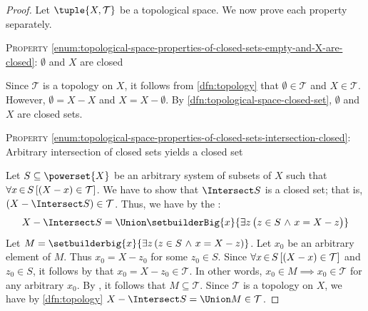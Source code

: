 \begin{proof}
    Let \( \tuple{X, \mathcal{T}} \) be a topological space. We now prove each property separately.
    
    \vspace{0.3cm}
    \noindent
    {\scshape Property} \ref{enum:topological-space-properties-of-closed-sets-empty-and-X-are-closed}: \( \emptyset \) and \( X \) are closed

    \vspace{0.1cm}
    \noindent
    Since \( \mathcal{T} \) is a topology on \( X \), it follows from \cref{dfn:topology} that \( \emptyset \in \mathcal{T} \) and \( X \in \mathcal{T} \).
    However, \( \emptyset = X - X \) and \( X = X - \emptyset \). By \cref{dfn:topological-space-closed-set}, \( \emptyset \) and \( X \) are closed sets.

    \vspace{0.3cm}
    \noindent
    {\scshape Property} \ref{enum:topological-space-properties-of-closed-sets-intersection-closed}: Arbitrary intersection of closed sets yields a closed set

    \vspace{0.1cm}
    \noindent
    Let \( S \subseteq \powerset{X} \) be an arbitrary system of subsets of \( X \) such that \( \forall x\,{\in}\,S \, \mleft[ (X - x) \in \mathcal{T} \mright] \).
    We have to show that \( \Intersect S \) is a closed set; that is, \( \mleft( X - \Intersect S \mright) \in \mathcal{T} \).
    Thus, we have by the :
    \begin{equation*}
        X - \Intersect S = \Union \setbuilderBig{x}{\exists z \, \big( z \in S \,\,{\land}\,\, x = X - z \big)}
    \end{equation*}
    Let \( M = \setbuilderbig{x}{\exists z \, \mleft( z \in S \,\,{\land}\,\, x = X - z \mright)} \). Let \( x_{0} \) be an arbitrary element of \( M \).
    Thus \(x_{0} = X - z_{0}\) for some \( z_{0} \in S \). Since \( \forall x\,{\in}\,S \, \mleft[ \mleft( X - x \mright) \in \mathcal{T} \mright] \) and
    \( z_{0} \in S \), it follows by  that \( x_{0} = X - z_{0} \in \mathcal{T} \).
    In other words, \( x_{0} \in M {\implies} x_{0} \in \mathcal{T} \) for any arbitrary \( x_{0} \).
    By , it follows that \( M \subseteq \mathcal{T} \).
    Since \( \mathcal{T} \) is a topology on \( X \), we have by \cref{dfn:topology} \( X - \Intersect S = \Union M \in \mathcal{T} \).


\end{proof}
